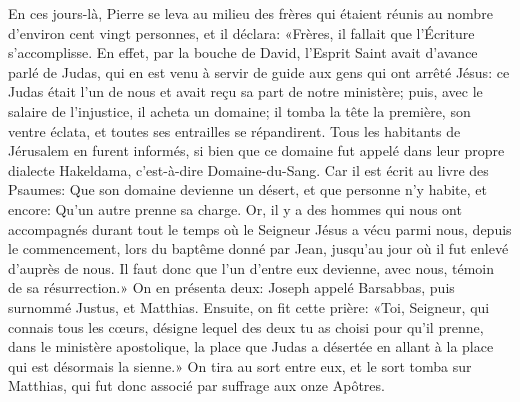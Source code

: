 En ces jours-là, Pierre se leva au milieu des frères
	qui étaient réunis au nombre d’environ cent vingt personnes, et il déclara:
	«Frères, il fallait que l’Écriture s’accomplisse.
En effet, par la bouche de David, l’Esprit Saint avait d’avance parlé de Judas,
	qui en est venu à servir de guide aux gens qui ont arrêté Jésus:
	ce Judas était l’un de nous et avait reçu sa part de notre ministère;
	puis, avec le salaire de l’injustice, il acheta un domaine;
	il tomba la tête la première, son ventre éclata,
	et toutes ses entrailles se répandirent.
Tous les habitants de Jérusalem en furent informés,
	si bien que ce domaine fut appelé dans leur propre dialecte Hakeldama,
	c’est-à-dire Domaine-du-Sang.
Car il est écrit au livre des Psaumes:
	Que son domaine devienne un désert, et que personne n’y habite,
	et encore: Qu’un autre prenne sa charge.
Or, il y a des hommes qui nous ont accompagnés
	durant tout le temps où le Seigneur Jésus a vécu parmi nous,
	depuis le commencement, lors du baptême donné par Jean,
	jusqu’au jour où il fut enlevé d’auprès de nous.
Il faut donc que l’un d’entre eux devienne, avec nous,
	témoin de sa résurrection.»
On en présenta deux:
	Joseph appelé Barsabbas, puis surnommé Justus, et Matthias.
Ensuite, on fit cette prière: «Toi, Seigneur, qui connais tous les cœurs,
	désigne lequel des deux tu as choisi
		pour qu’il prenne, dans le ministère apostolique,
	la place que Judas a désertée
		en allant à la place qui est désormais la sienne.»
On tira au sort entre eux, et le sort tomba sur Matthias,
	qui fut donc associé par suffrage aux onze Apôtres.
